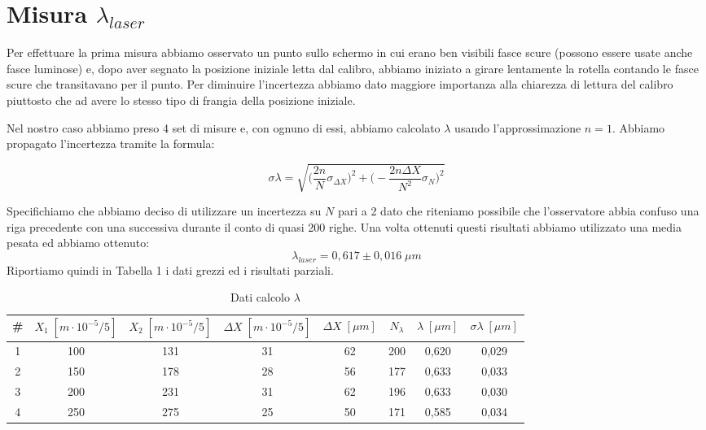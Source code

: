 \documentclass{article}
\begin{document}
\section{Misura $\lambda_{laser}$}
Per effettuare la prima misura abbiamo osservato un punto sullo schermo in cui erano ben visibili fasce scure (possono essere usate anche fasce luminose) e, dopo aver segnato la posizione iniziale letta dal calibro, abbiamo iniziato a girare lentamente la rotella contando le fasce scure che transitavano per il punto. Per diminuire l'incertezza abbiamo dato maggiore importanza alla chiarezza di lettura del calibro piuttosto che ad avere lo stesso tipo di frangia della posizione iniziale.

\vspace{3mm}

Nel nostro caso abbiamo preso 4 set di misure e, con ognuno di essi, abbiamo calcolato $\lambda$ usando l'approssimazione $n = 1$. Abbiamo propagato l'incertezza tramite la formula:

\begin{equation} 
\sigma\lambda= \sqrt{\bigg(\frac{2 n}{N} \sigma_{\Delta X}\bigg)^2 + \bigg({-} \frac{2 n \Delta X}{N^2} \sigma_N\bigg)^2}
\end{equation}

Specifichiamo che abbiamo deciso di utilizzare un incertezza su $N$ pari a 2 dato che riteniamo possibile che l'osservatore abbia confuso una riga precedente con una successiva durante il conto di quasi 200 righe.
Una volta ottenuti questi risultati abbiamo utilizzato una media pesata ed abbiamo ottenuto:
\[ \lambda_{laser} = 0,617 \pm 0,016 \; \mu m \]
Riportiamo quindi in Tabella 1 i dati grezzi ed i risultati parziali.


\begin{table}[h!]
\centering
\begin{tabular}{ | c | c | c | c | c | c | c | c |}
\hline
 \# & $X_1 \; [m \cdot 10^{-5}/5]$ & $X_2 \; [m \cdot 10^{-5}/5]$ & $\Delta X \; [m \cdot 10^{-5}/5]$ & $\Delta X \; [\mu m]$ & $N_\lambda$ & $\lambda \; [\mu m]$ & $\sigma\lambda \; [\mu m]$\\
\hline
   1 & 100 & 131 & 31 & 62 & 200 & 0,620 & 0,029\\
   2 & 150 & 178 & 28 & 56 & 177 & 0,633 & 0,033\\
   3 & 200 & 231 & 31 & 62 & 196 & 0,633 & 0,030\\
   4 & 250 & 275 & 25 & 50 & 171 & 0,585 & 0,034\\
\hline
\end{tabular}
\caption{Dati calcolo $\lambda$}
\label{table:1}
\end{table}
\end{document}
